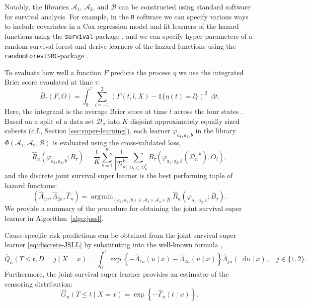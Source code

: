\documentclass[alpha-refs]{wiley-article}
\renewcommand{\phi}{\varphi}
\newcommand*\diff{\mathop{}\!\mathrm{d}}
\newcommand{\1}{\mathds{1}}
\DeclareMathOperator*{\argmin}{\arg\!\min}
\newcommand{\data}{\ensuremath{\mathcal{D}}}
\begin{document}
  Notably, the libraries \( \mathcal{A}_1 \), \(
\mathcal{A}_2 \), and \( \mathcal{B} \) can be constructed using
standard software for survival analysis.  For example, in the
\texttt{R} software we can specify various ways to include covariates
in a Cox regression model and fit learners of the hazard functions
using the \texttt{survival}-package \citep{survival-package}, and we
can specify hyper parameters of a random survival forest and derive
learners of the hazard functions using the
\texttt{randomForestSRC}-package \citep{randomForestSRC}.

To evaluate how well a function \( F \) predicts the
process $\eta$ we use the integrated Brier score \citep{graf1999assessment}
evaulated at time \(\tau\):
\begin{equation*}
  \bar B_\tau(F,O) = \int_0^{\tau} \sum_{l=-1}^{2}
  \left(
      F(t,l,X) - \1{\{\eta(t)=l\}}
  \right)^2\diff t.
\end{equation*}
Here, the integrand is the average Brier score at time \(t\) across
the four states \citep{brier1950verification}. Based on a split of a
data set \(\data_n\) into $K$ disjoint approximately equally sized
subsets (c.f., Section \ref{sec:super-learning}), each learner \(
\phi_{a_1, a_2, b} \) in the library \( \Phi(\mathcal{A}_1,
\mathcal{A}_2, \mathcal{B}) \) is evaluated using the cross-validated
loss,
\begin{equation*}
  \hat{R}_{n}(\phi_{a_1,a_2,b} ; \bar{B}_{\tau}) =
  \frac{1}{K}\sum_{k=1}^{K}
  \frac{1}{| \data_n^{k} |}\sum_{O_i \in \data_n^{k}}
  \bar B_\tau
  {
    \left(
      \phi_{a_1,a_2,b}{ (\data_n^{-k})}
      , O_i
    \right)
  },
\end{equation*}
and the discrete joint survival super learner is the best performing tuple of hazard functions:
\begin{equation}\label{eq:discrete-JSLL}
  (\hat \Lambda_{1n},\hat \Lambda_{2n}, \hat \Gamma_{n})
  =  \argmin_{(a_1,a_2,b)\in \mathcal{A}_1\times\mathcal{A}_2\times\mathcal{B}}
  \hat{R}_{n}(\phi_{a_1,a_2,b} ; \bar{B}_{\tau}).
\end{equation}
We provide a summary of the procedure for obtaining the joint survival
super learner in Algorithm~\ref{algo:jossl}.
  
Cause-specific risk predictions can be obtained from
the joint survival super learner \eqref{eq:discrete-JSLL} by
substituting into the well-known formula
\citep[e.g.,][]{benichou1990estimates, ozenne2017riskregression},
\begin{equation}
  \label{eq:cs-risk-def} \hat Q_n(T \leq t, D = j \mid X=x) = \int_0^t
\exp\left\{-\hat\Lambda_{1n}(u \mid x)-\hat\Lambda_{2n}(u \mid
x)\right\} \hat\Lambda_{jn}(\diff u \mid x), \quad j \in \{1,2\}.
\end{equation} Furthermore, the joint survival super learner provides an
estimator of the censoring distribution:
\begin{equation*}
 \hat G_n(T \leq t \mid X=x) = \exp\left\{-\hat\Gamma_n(t \mid x)\right\}.
\end{equation*}
\end{document}
